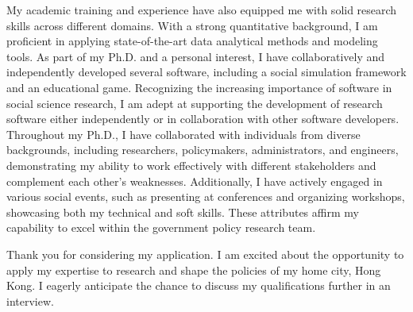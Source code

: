 \documentclass[11pt, a4paper]{awesome-cv}
\begin{document}
\begin{cvletter}
My academic training and experience have also equipped me with solid research skills across different domains. With a strong quantitative background, I am proficient in applying state-of-the-art data analytical methods and modeling tools. As part of my Ph.D. and a personal interest, I have collaboratively and independently developed several software, including a social simulation framework and an educational game. Recognizing the increasing importance of software in social science research, I am adept at supporting the development of research software either independently or in collaboration with other software developers. Throughout my Ph.D., I have collaborated with individuals from diverse backgrounds, including researchers, policymakers, administrators, and engineers, demonstrating my ability to work effectively with different stakeholders and complement each other's weaknesses. Additionally, I have actively engaged in various social events, such as presenting at conferences and organizing workshops, showcasing both my technical and soft skills. These attributes affirm my capability to excel within the government policy research team.

Thank you for considering my application. I am excited about the opportunity to apply my expertise to research and shape the policies of my home city, Hong Kong. I eagerly anticipate the chance to discuss my qualifications further in an interview.


\end{cvletter}


\makeletterclosing
\end{document}
